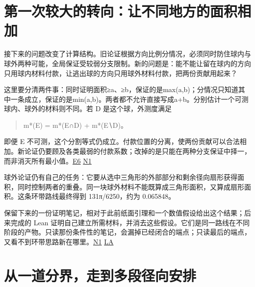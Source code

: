 \section{第一次较大的转向：让不同地方的面积相加}\label{ux7b2cux4e00ux6b21ux8f83ux5927ux7684ux8f6cux5411ux8ba9ux4e0dux540cux5730ux65b9ux7684ux9762ux79efux76f8ux52a0}

接下来的问题改变了计算结构。旧论证根据方向比例分情况，必须同时防住球内与球外两种可能，全局保证受较弱分支限制。新的问题是：能不能让留在球内的方向只用球内材料付款，让逃出球的方向只用球外材料付款，把两份贡献用起来？

这里要分清两件事：同时证明面积≥a、≥b，保证的是max(a,b)；分情况只知道其中一条成立，保证的是min(a,b)。两者都不允许直接写成a+b。分别估计一个可测球内、球外的材料则不同。若 D 是这个球，外测度满足

\begin{quote}
m*(E) = m*(E∩D) + m*(E∖D)。
\end{quote}

即便 E 不可测，这个分割等式仍成立。付款位置的分离，使两份贡献可以合法相加。新论证仍要顾及各类最弱的付款系数；改掉的是只能在两种分支保证中择一，而非消灭所有最小值。\href{https://github.com/subfish-zhou/star-shaped-kakeya-lean/blob/6432d8eb33cc2093ed5ca1f5e63390e4bf065fd0/history-sources/E6-STRONGER-100-OVER-5599-PROOF.md}{E6} \href{https://github.com/subfish-zhou/star-shaped-kakeya-lean/blob/6432d8eb33cc2093ed5ca1f5e63390e4bf065fd0/history/001-joint-inner-outer/README.md}{N1}

球外论证仍有自己的任务：它要从选中三角形的外部部分和剩余径向扇形获得面积，同时控制两者的重叠。同一块球外材料不能既算成三角形面积，又算成扇形面积。这条环带路线最终得到 131π/6250，约为 \allowbreak{}0.065848。

保留下来的一份证明笔记，相对于此前纸面引理和一个数值假设给出这个结果；后来完成的 Lean 证明自己建立所需材料，并消去这些假设。它们是同一路线在不同阶段的产物。只读那份条件性的笔记，会漏掉已经闭合的端点；只读最后的端点，又看不到环带思路新在哪里。\href{https://github.com/subfish-zhou/star-shaped-kakeya-lean/blob/6432d8eb33cc2093ed5ca1f5e63390e4bf065fd0/history/001-joint-inner-outer/README.md}{N1} \href{https://github.com/subfish-zhou/star-shaped-kakeya-lean/blob/6432d8eb33cc2093ed5ca1f5e63390e4bf065fd0/audits/historical-lean-audit.md}{LA}

\section{从一道分界，走到多段径向安排}\label{ux4eceux4e00ux9053ux5206ux754cux8d70ux5230ux591aux6bb5ux5f84ux5411ux5b89ux6392}


